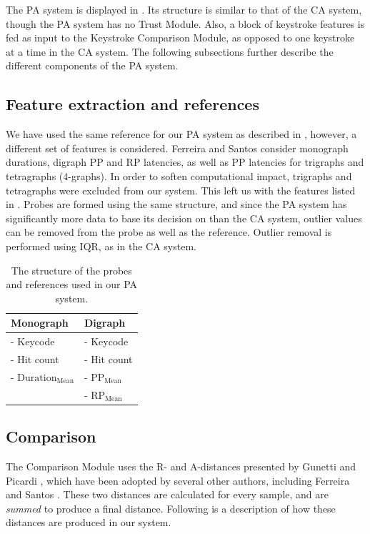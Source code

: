 The PA system is displayed in .
Its structure is similar to that of the CA system, though the PA system has no Trust Module. 
Also, a block of keystroke features is fed as input to the Keystroke Comparison Module, as opposed to one keystroke at a time in the CA system.
The following subsections further describe the different components of the PA system.

\subsection{Feature extraction and references}
We have used the same reference for our PA system as described in , however, a different set of features is considered.
Ferreira and Santos \cite{superResults} consider monograph durations, digraph PP and RP latencies, as well as PP latencies for trigraphs and tetragraphs (4-graphs).
In order to soften computational impact, trigraphs and tetragraphs were excluded from our system.
This left us with the features listed in .
Probes are formed using the same structure, and since the PA system has significantly more data to base its decision on than the CA system, outlier values can be removed from the probe as well as the reference.
Outlier removal is performed using IQR, as in the CA system.

\begin{table}[h]
\centering
\begin{tabular}{|l|l|}
\hline
Monograph & Digraph\\ \hline
- Keycode & - Keycode\\
- Hit count & - Hit count\\
- $\text{Duration}_{\text{Mean}} $& - $\text{PP}_{\text{Mean}}$\\
& - $\text{RP}_{\text{Mean}}$ \\
\hline
\end{tabular}

\caption{The structure of the probes and references used in our PA system.}
\label{tab:PA-reference-structure}
\end{table}

\subsection{Comparison}
\label{sec:system-design-PA-comparison}
The Comparison Module uses the R- and A-distances presented by Gunetti and Picardi \cite{gnp}, which have been adopted by several other authors, including Ferreira and Santos \cite{superResults}.
These two distances are calculated for every sample, and are \textit{summed} to produce a final distance.
Following is a description of how these distances are produced in our system.

